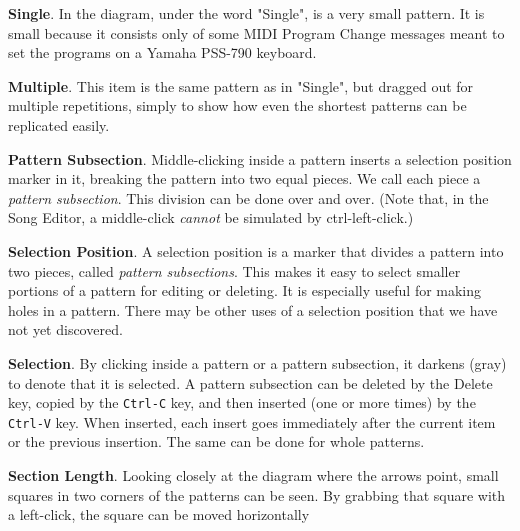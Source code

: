    \begin{enumber}
      \item \textbf{Single}.
         In the diagram, under the word "Single", is a very small pattern.
         It is small because it consists only of some MIDI Program Change
         messages meant to set the programs on a Yamaha PSS-790 keyboard.
      \item \textbf{Multiple}.
         This item is the same pattern as in "Single", but dragged out for
         multiple repetitions, simply to show how even the shortest patterns
         can be replicated easily.
      \item \textbf{Pattern Subsection}.
         Middle-clicking inside a pattern inserts a selection position
         marker in it, breaking the pattern into two equal pieces.
         We call each piece a \textsl{pattern subsection}.
         This division can be done over and over.
         (Note that, in the Song Editor, a middle-click
          \textsl{cannot} be simulated by ctrl-left-click.)
      \item \textbf{Selection Position}.
         A selection position is a marker that divides a pattern into two
         pieces, called \textsl{pattern subsections}.  This makes it easy to
         select smaller portions of a pattern for editing or deleting.  It
         is especially useful for making holes in a pattern.  There may be
         other uses of a selection position that we have not yet discovered.
      \item \textbf{Selection}.
         By clicking inside a pattern or a pattern subsection, it darkens
         (gray) to denote that it is selected.
         A pattern subsection can be deleted by the
         Delete key, copied by the
         \texttt{Ctrl-C} key, and then inserted (one or more times) by the
         \texttt{Ctrl-V} key.  When inserted, each insert goes immediately
         after the current item or the previous insertion.  The same can be
         done for whole patterns.
      \item \textbf{Section Length}.
         Looking closely at the diagram where the arrows point, small
         squares in two corners of the patterns can be seen.  By grabbing
         that square with a left-click, the square can be moved horizontally

\end{enumber}
